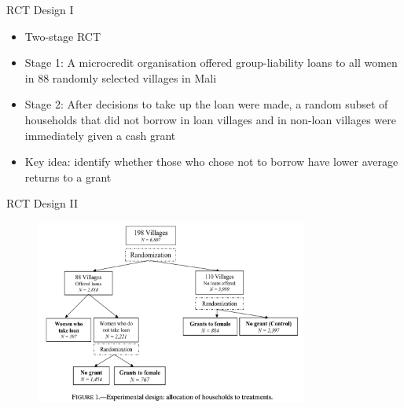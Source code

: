 \documentclass[11pt,notes=hide,aspectratio=169,mathserif]{beamer}
\begin{document}
\begin{frame}{RCT Design I}
\begin{itemize}
    \item Two-stage RCT 
    \pause \item Stage 1: A microcredit organisation offered group-liability loans to all women in 88 randomly selected villages in Mali 
    \pause \item Stage 2: After decisions to take up the loan were made, a random subset of households that did not borrow in loan villages and in non-loan villages were immediately given a cash grant
    \pause \item Key idea: identify whether those who chose not to borrow have lower average returns to a grant
\end{itemize}
\end{frame}

\begin{frame}{RCT Design II}
    \begin{figure}
            \centering
            \includegraphics[width=0.8\textwidth]{inputs/fig3.png}
    \end{figure}
\end{frame}
\end{document}
